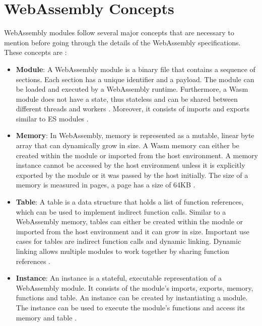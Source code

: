 \section{WebAssembly Concepts}
\label{sec:wasm-concepts}

WebAssembly modules follow several major concepts that are necessary to mention before going through the details of the WebAssembly specifications. These concepts are \cite{mozillacorporation_2023_webassembly}:

\begin{itemize}
  \item \textbf{Module}: A WebAssembly module is a binary file that contains a sequence of sections. Each section has a unique identifier and a payload. The module can be loaded and executed by a WebAssembly runtime. Furthermore, a Wasm module does not have a state, thus stateless and can be shared between different threads and workers \cite[sec. 1.2.1]{webassemblycommunitygroup_2023_webassembly}. Moreover, it consists of imports and exports similar to ES modules \cite{mozillafoundation_javascript}.
  \item \textbf{Memory}: In WebAssembly, memory is represented as a mutable, linear byte array that can dynamically grow in size. A Wasm memory can either be created within the module or imported from the host environment. A memory instance cannot be accessed by the host environment unless it is explicitly exported by the module or it was passed by the host initially. The size of a memory is measured in pages, a page has a size of 64KB \cite[sec. 4.2.8]{webassemblycommunitygroup_2023_webassembly}. 
  \item \textbf{Table}: A table is a data structure that holds a list of function references, which can be used to implement indirect function calls. Similar to a WebAssembly memory, tables can either be created within the module or imported from the host environment and it can grow in size. Important use cases for tables are indirect function calls and dynamic linking. Dynamic linking allows multiple modules to work together by sharing function references \cite{webassemblycommunitygroup_2023_webassembly,sletten_2021_webassembly}.
  \item \textbf{Instance}: An instance is a stateful, executable representation of a WebAssembly module. It consists of the module's imports, exports, memory, functions and table. An instance can be created by instantiating a module. The instance can be used to execute the module's functions and access its memory and table \cite[sec. 1.2.2]{webassemblycommunitygroup_2023_webassembly}. 
\end{itemize}
